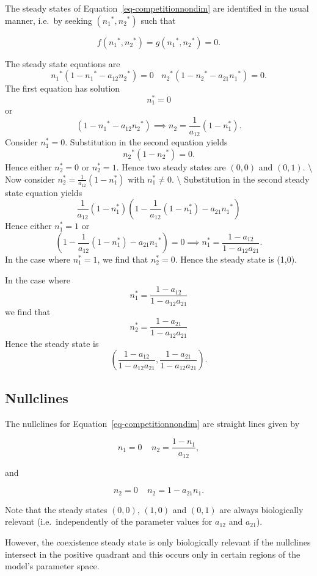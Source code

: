 \documentclass[
  letterpaper,
  DIV=11,
  numbers=noendperiod]{scrreprt}
\begin{document}
The steady states of Equation~\ref{eq-competitionnondim} are identified
in the usual manner, i.e.~by seeking \(({n_1}^*,{n_2}^*)\) such that

\[
f({n_1}^*,{n_2}^*)=g({n_1}^*,{n_2}^*)=0.
\]

The steady state equations are \[
 {n_1}^*\left(1- {n_1}^*-a_{12}{n_2}^*\right)=0 \ \ \ \ {n_2}^*\left(1-{n_2}^*-a_{21}{n_1}^*\right)=0.
\] The first equation has solution \[
n_1^*=0
\] or \[
\left(1- {n_1}^*-a_{12}{n_2}^*\right) \implies n_2=\frac{1}{a_{12}}(1-n_1^*).
\] Consider \(n_1^*=0\). Substitution in the second equation yields \[
 {n_2}^*\left(1-{n_2}^*\right)=0.
 \] Hence either \(n_2^*=0\) or \(n_2^*=1\). Hence two steady states are
\((0,0)\) and \((0,1).\) \textbackslash{} Now consider
\(n_2^*=\frac{1}{a_{12}}(1-n_1^*)\) with \(n_1^*\neq0\).
\textbackslash{} Substitution in the second steady state equation yields
\[
\frac{1}{a_{12}}(1-n_1^*) \left(1- \frac{1}{a_{12}}(1-n_1^*) -a_{21}{n_1}^*\right)
 \] Hence either \(n_1^*=1\) or \[
 \left(1- \frac{1}{a_{12}}(1-n_1^*) -a_{21}{n_1}^*\right)=0 \implies n_1^*=\frac{1-a_{12}}{1-a_{12}a_{21}}.
 \] In the case where \(n_1^*=1\), we find that \(n_2^*=0\). Hence the
steady state is (1,0).

In the case where \[
n_1^*=\frac{1-a_{12}}{1-a_{12}a_{21}}
\] we find that \[
n_2^*=\frac{1-a_{21}}{1-a_{12}a_{21}}
\] Hence the steady state is \[
\left(\frac{1-a_{12}}{1-a_{12}a_{21}},\frac{1-a_{21}}{1-a_{12}a_{21}}\right).
\]

\hypertarget{nullclines-1}{%
\subsection{Nullclines}\label{nullclines-1}}

The nullclines for Equation~\ref{eq-competitionnondim} are straight
lines given by

\[
 n_1=0 \ \ \ \ \ n_2=\frac{1-n_1}{a_{12}}, 
 \]

and

\[ 
 n_2=0 \ \  \ \  \ n_2= 1-a_{21}n_1.
 \]

Note that the steady states \((0,0)\), \((1,0)\) and \((0,1)\) are
always biologically relevant (i.e.~independently of the parameter values
for \(a_{12}\) and \(a_{21}\)).

However, the coexistence steady state is only biologically relevant if
the nullclines intersect in the positive quadrant and this occurs only
in certain regions of the model's parameter space.
\end{document}
